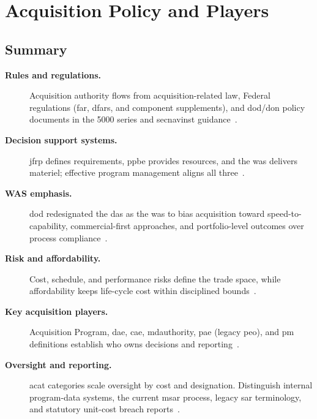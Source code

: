 \documentclass[../main.tex]{subfiles}
\begin{document}
\section{Acquisition Policy and Players}

\subsection{Summary}
\begin{description}
  \item[\textbf{Rules and regulations.}] Acquisition authority flows from acquisition-related law, Federal regulations (\ac{far}, \ac{dfars}, and component supplements), and \ac{dod}/\ac{don} policy documents in the 5000 series and \ac{secnavinst} guidance~\autocite{edo-3-3-1-acq-policy-players-2025}.
  \item[\textbf{Decision support systems.}] \ac{jfrp} defines requirements, \ac{ppbe} provides resources, and the \ac{was} delivers materiel; effective program management aligns all three~\autocite{edo-3-3-1-acq-policy-players-2025}.
  \item[\textbf{WAS emphasis.}] \ac{dod} redesignated the \ac{das} as the \ac{was} to bias acquisition toward speed-to-capability, commercial-first approaches, and portfolio-level outcomes over process compliance~\autocite{secwar-was-memo-2025,secwar-acq-transformation-2025}.
  \item[\textbf{Risk and affordability.}] Cost, schedule, and performance risks define the trade space, while affordability keeps life-cycle cost within disciplined bounds~\autocite{edo-3-3-1-acq-policy-players-2025}.
  \item[\textbf{Key acquisition players.}] Acquisition Program, \ac{dae}, \ac{cae}, \ac{mdauthority}, \ac{pae} (legacy \ac{peo}), and \ac{pm} definitions establish who owns decisions and reporting~\autocite{edo-3-3-1-acq-policy-players-2025}.
  \item[\textbf{Oversight and reporting.}] \ac{acat} categories scale oversight by cost and designation. Distinguish internal program-data systems, the current \ac{msar} process, legacy \ac{sar} terminology, and statutory unit-cost breach reports~\autocite{USC-10-4351,DOD-MSAR-Transition-2023,USC-10-4374}.
\end{description}
\end{document}
